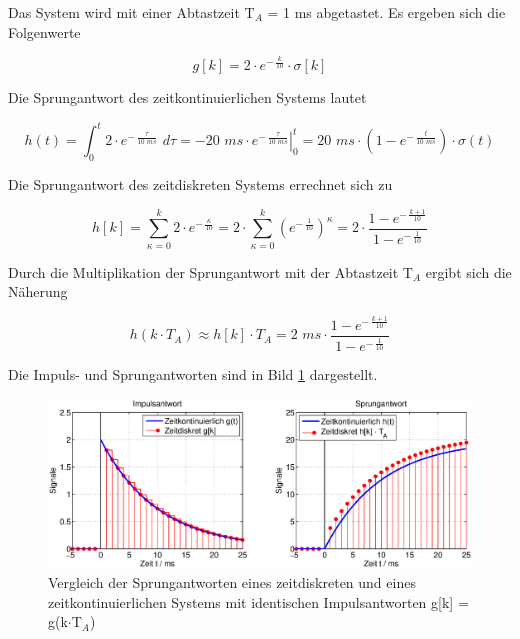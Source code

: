 \noindent Das System wird mit einer Abtastzeit T${}_{A}$ = 1 ms abgetastet. Es ergeben sich die Folgenwerte 

\begin{equation}\label{eq:sixfourtysix}
g\left[k\right]=2\cdot e^{-\, \frac{k}{10} } \cdot \sigma \left[k\right]
\end{equation}

\noindent Die Sprungantwort des zeitkontinuierlichen Systems lautet

\begin{equation}\label{eq:sixfourtyseven}
h\left(t\right)=\int _{0}^{t}2\cdot e^{-\, \frac{\tau }{10\, \, ms} } \, \, d\tau  =-20\, \, ms\cdot \left. e^{-\, \frac{\tau }{10\, \, ms} } \right|_{0}^{t} =20\, \, ms\cdot \left(1-e^{-\, \frac{t}{10\, \, ms} } \right)\cdot \sigma \left(t\right)
\end{equation}

\noindent Die Sprungantwort des zeitdiskreten Systems errechnet sich zu

\begin{equation}\label{eq:sixfourtyeight}
h\left[k\right]=\sum _{\kappa =0}^{k}2\cdot e^{-\, \frac{\kappa }{10} }  =2\cdot \sum _{\kappa =0}^{k}\left(e^{-\, \frac{1}{10} } \right) ^{\kappa } =2\cdot \frac{1-e^{-\, \frac{k+1}{10} } }{1-e^{-\, \frac{1}{10} } }
\end{equation}

\noindent Durch die Multiplikation der Sprungantwort mit der Abtastzeit T${}_{A}$ ergibt sich die N\"{a}herung

\begin{equation}\label{eq:sixfourtynine}
h\left(k\cdot T_{A} \right)\approx h\left[k\right]\cdot T_{A} =2\, \, ms\cdot \frac{1-e^{-\, \frac{k+1}{10} } }{1-e^{-\, \frac{1}{10}}}
\end{equation}

\noindent Die Impuls- und Sprungantworten sind in Bild \ref{fig:VergleichSprungantworten} dargestellt.

\begin{figure}[H]
  \centerline{\includegraphics[width=1\textwidth]{Kapitel6/Bilder/image4.eps}}
  \caption{Vergleich der Sprungantworten eines zeitdiskreten und eines zeitkontinuierlichen Systems mit identischen Impulsantworten g[k] = g(k$\cdot$T${}_{A}$)}
  \label{fig:VergleichSprungantworten}
\end{figure}

